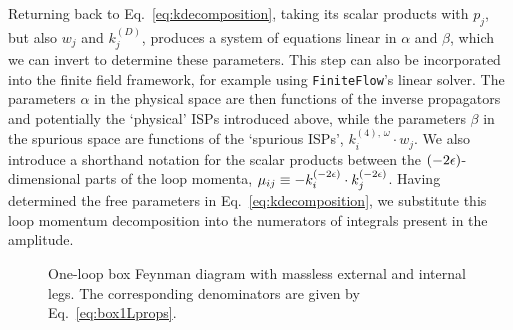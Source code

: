 \documentclass[main.tex]{subfiles}
\begin{document}
Returning back to Eq.~\ref{eq:kdecomposition}, taking its scalar products with $p_j$, but also $w_j$ and $k_j^{(D)}$, produces a system of equations linear in $\alpha$ and $\beta$, which we can invert to determine these parameters. This step can also be incorporated into the finite field framework, for example using \texttt{FiniteFlow}'s linear solver. The parameters $\alpha$ in the physical space are then functions of the inverse propagators and potentially the `physical' ISPs introduced above, while the parameters $\beta$ in the spurious space are functions of the `spurious ISPs', $k_i^{(4),\, \omega} \cdot w_j$. We also introduce a shorthand notation for the scalar products between the $(-2\epsilon)$-dimensional parts of the loop momenta, $\mu_{ij} \equiv -k_i^{(-2\epsilon)} \cdot k_j^{(-2\epsilon)}$. Having determined the free parameters in Eq.~\ref{eq:kdecomposition}, we substitute this loop momentum decomposition into the numerators of integrals present in the amplitude. 
\begin{figure}
    \centering
    \caption{One-loop box Feynman diagram with massless external and internal legs. The corresponding denominators are given by Eq.~\ref{eq:box1Lprops}.} \label{fig:1Lboxnodot}
\end{figure}
\end{document}
